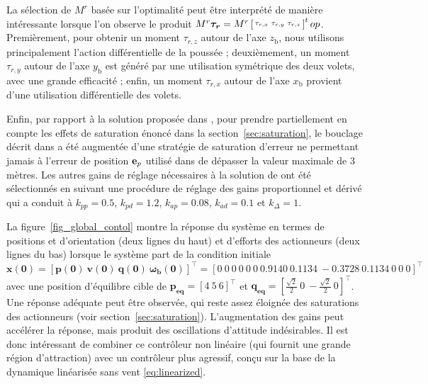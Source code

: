La sélection de $M^r$ basée sur l'optimalité peut être interprété de manière intéressante lorsque l'on observe le produit $M^r \boldsymbol{\tau_{r}} = M^r \left[ \begin{smallmatrix}\tau_{r,x} & \tau_{r,y} & \tau_{r,z} \end{smallmatrix} \right]^top$. Premièrement, pour obtenir un moment $\tau_{r,z}$ autour de l'axe $z_{\text{b}}$, nous utilisons principalement l'action différentielle de la poussée ; deuxièmement, un moment $\tau_{r,y}$ autour de l'axe $y_{\text{b}}$ est généré par une utilisation symétrique des deux volets, avec une grande efficacité ; enfin, un moment $\tau_{r,x}$ autour de l'axe $x_{\text{b}}$ provient d'une utilisation différentielle des volets. 

Enfin, par rapport à la solution proposée dans \cite{2020e-MicCenZacFra}, pour prendre partiellement en compte les effets de saturation énoncé dans la section~\ref{sec:saturation}, le bouclage décrit dans \cite{2020e-MicCenZacFra} a été augmentée d'une stratégie de saturation d'erreur ne permettant jamais à l'erreur de position $\boldsymbol{\rm e}_p$ utilisé dans \cite[eqn. (22)]{2020e-MicCenZacFra} de dépasser la valeur maximale de 3 mètres. Les autres gains de réglage nécessaires à la solution de \cite{2020e-MicCenZacFra} ont été sélectionnés
en suivant une procédure de réglage des gains proportionnel et dérivé qui a conduit à $k_{pp} = 0.5$, $k_{pd} = 1.2$, $k_{ap} = 0.08$, $k_{ad} = 0.1$ et $k_{\Delta} = 1$.
 
La figure~\ref{fig_global_contol} montre la réponse du système en termes de positions et d'orientation (deux lignes du haut) et d'efforts des actionneurs (deux lignes du bas) lorsque le système part de la condition initiale $\boldsymbol{x(0)} = [\boldsymbol{p(0)}~ \boldsymbol{v(0)}~ \boldsymbol{q(0)}~ \boldsymbol{\omega_b(0)}]^\top = [0~0~0 ~ 0~0~0 ~0. 9140 ~0.1134~ -0.3728~ 0. 1134~ 0~ 0~ 0]^\top $ avec une position d'équilibre cible de $\boldsymbol{p_{\text{eq}}} = [4~5~6]^\top$ et $\boldsymbol{q_{\text{eq}}} = [\frac{\sqrt{2}}{2}~0~-\frac{\sqrt{2}}{2}~0]^\top$. 
Une réponse adéquate peut être observée, qui reste assez éloignée des saturations des actionneurs (voir section~\ref{sec:saturation}). L'augmentation des gains peut accélérer la réponse, mais produit des oscillations d'attitude indésirables. Il est donc intéressant de combiner ce contrôleur non linéaire (qui fournit une grande région d'attraction) avec un contrôleur plus agressif, conçu sur la base de la dynamique linéarisée sans vent \eqref{eq:linearized}.


